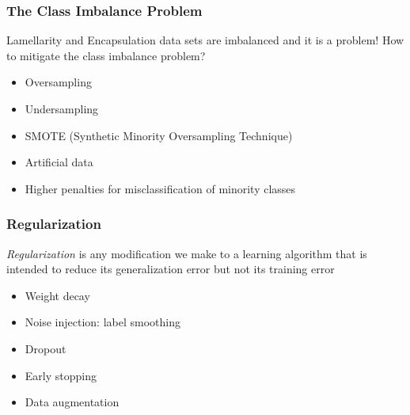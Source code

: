 \documentclass{beamer}
\begin{document}
%
%

\begin{frame}
\frametitle{The Class Imbalance Problem}

Lamellarity and Encapsulation data sets are imbalanced and it is a problem!
\vskip 0.2in
How to mitigate the class imbalance problem?
\begin{itemize}
\item Oversampling
\item Undersampling
\item SMOTE (Synthetic Minority Oversampling Technique)
\item Artificial data
\item Higher penalties for misclassification of minority classes
\end{itemize}


\end{frame}

%
%

\begin{frame}
\frametitle{Regularization}

\begin{definition}
\textit{Regularization} is any modification we make to a learning algorithm that is intended to reduce its generalization error but not its training error
\end{definition}

\begin{itemize}
\item Weight decay
\item Noise injection: label smoothing
\item Dropout
\item Early stopping
\item Data augmentation
\end{itemize}

\end{frame}

%
%
\end{document}

